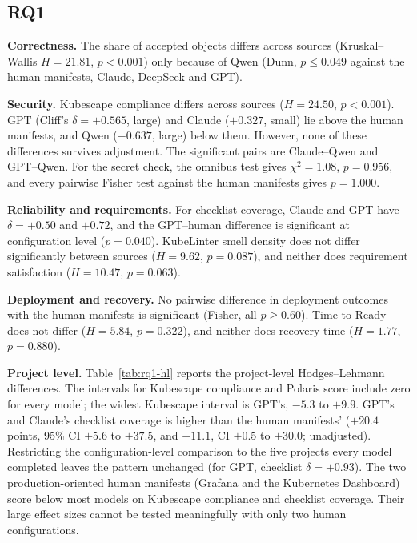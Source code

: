 \subsection{RQ1}

\textbf{Correctness.} The share of accepted objects differs across sources (Kruskal--Wallis $H=21.81$, $p<0.001$) only because of Qwen (Dunn, $p\le0.049$ against the human manifests, Claude, DeepSeek and GPT).

\textbf{Security.} Kubescape compliance differs across sources ($H=24.50$, $p<0.001$). GPT (Cliff's $\delta=+0.565$, large) and Claude ($+0.327$, small) lie above the human manifests, and Qwen ($-0.637$, large) below them. However, none of these differences survives adjustment. The significant pairs are Claude--Qwen and GPT--Qwen. For the secret check, the omnibus test gives $\chi^2=1.08$, $p=0.956$, and every pairwise Fisher test against the human manifests gives $p=1.000$.

\textbf{Reliability and requirements.} For checklist coverage, Claude and GPT have $\delta=+0.50$ and $+0.72$, and the GPT--human difference is significant at configuration level ($p=0.040$). KubeLinter smell density does not differ significantly between sources ($H=9.62$, $p=0.087$), and neither does requirement satisfaction ($H=10.47$, $p=0.063$).

\textbf{Deployment and recovery.} No pairwise difference in deployment outcomes with the human manifests is significant (Fisher, all $p\ge0.60$). Time to Ready does not differ ($H=5.84$, $p=0.322$), and neither does recovery time ($H=1.77$, $p=0.880$).

\textbf{Project level.} Table~\ref{tab:rq1-hl} reports the project-level Hodges--Lehmann differences. The intervals for Kubescape compliance and Polaris score include zero for every model; the widest Kubescape interval is GPT's, $-5.3$ to $+9.9$. GPT's and Claude's checklist coverage is higher than the human manifests' ($+20.4$ points, 95\% CI $+5.6$ to $+37.5$, and $+11.1$, CI $+0.5$ to $+30.0$; unadjusted). Restricting the configuration-level comparison to the five projects every model completed leaves the pattern unchanged (for GPT, checklist $\delta=+0.93$). The two production-oriented human manifests (Grafana and the Kubernetes Dashboard) score below most models on Kubescape compliance and checklist coverage. Their large effect sizes cannot be tested meaningfully with only two human configurations.

